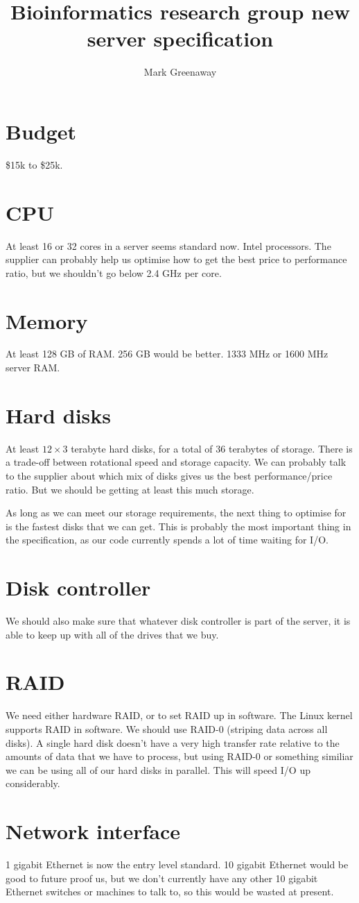 \documentclass{amsart}
\author{Mark Greenaway}
\title{Bioinformatics research group new server specification}
\begin{document}
\maketitle

\section{Budget}
\$15k to \$25k.

\section{CPU}
At least 16 or 32 cores in a server seems standard now. Intel processors. The supplier
can probably help us optimise how to get the best price to performance ratio, but we
shouldn't go below 2.4 GHz per core.

\section{Memory}
At least 128 GB of RAM. 256 GB would be better. 1333 MHz or 1600 MHz server RAM.

\section{Hard disks}
At least $12 \times 3$ terabyte hard disks, for a total of 36 terabytes of storage.
There is a trade-off between rotational speed and storage capacity. We can probably talk to 
the supplier about which mix of disks gives us the best performance/price ratio. But we 
should be getting at least this much storage.

As long as we can meet our storage requirements, the next thing to optimise for is the
fastest disks that we can get. This is probably the most important thing in the
specification, as our code currently spends a lot of time waiting for I/O.

\section{Disk controller}
We should also make sure that whatever disk controller is part of the server, it is able
to keep up with all of the drives that we buy.

\section{RAID}
We need either hardware RAID, or to set RAID up in software. The Linux kernel supports
RAID in software.  We should use RAID-0 (striping data across all disks). A single hard disk 
doesn't have a very  high transfer rate relative to the amounts of data that we have to 
process, but using RAID-0 or something similiar we can be using all of our hard disks in 
parallel. This will speed I/O up considerably.

\section{Network interface}
1 gigabit Ethernet is now the entry level standard. 10 gigabit Ethernet would be good to
future proof us, but we don't currently have any other 10 gigabit Ethernet switches or 
machines to talk to, so this would be wasted at present.
\end{document}
